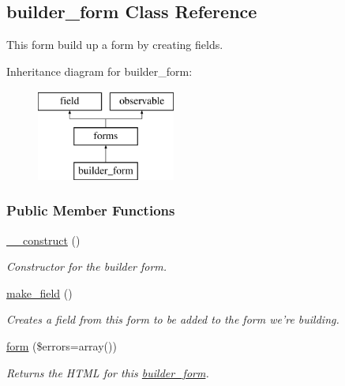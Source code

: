 \hypertarget{classbuilder__form}{\subsection{builder\-\_\-form Class Reference}
\label{classbuilder__form}
}


This form build up a form by creating fields.  


Inheritance diagram for builder\-\_\-form\-:\begin{figure}[H]
\begin{center}
\leavevmode
\includegraphics[height=3.000000cm]{classbuilder__form}
\end{center}
\end{figure}
\subsubsection*{Public Member Functions}
\begin{DoxyCompactItemize}
\item 
\hypertarget{classbuilder__form_ade3d134c630ac6d5b81378c5f4f48eb5}{\hyperlink{classbuilder__form_ade3d134c630ac6d5b81378c5f4f48eb5}{\-\_\-\-\_\-construct} ()}\label{classbuilder__form_ade3d134c630ac6d5b81378c5f4f48eb5}

\begin{DoxyCompactList}\small\item\em Constructor for the builder form. \end{DoxyCompactList}\item 
\hyperlink{classbuilder__form_a6408926fe73438032738d8a0095acf8d}{make\-\_\-field} ()
\begin{DoxyCompactList}\small\item\em Creates a field from this form to be added to the form we're building. \end{DoxyCompactList}\item 
\hyperlink{classbuilder__form_a13989dd465615470a1145b401c672fcb}{form} (\$errors=array())
\begin{DoxyCompactList}\small\item\em Returns the H\-T\-M\-L for this \hyperlink{classbuilder__form}{builder\-\_\-form}. \end{DoxyCompactList}\end{DoxyCompactItemize}
